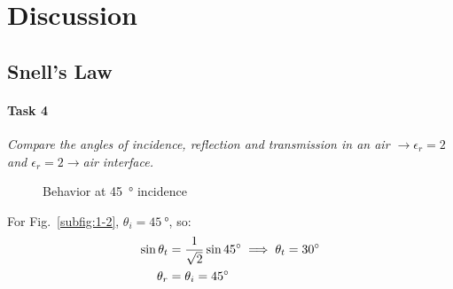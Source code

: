 \pagebreak
\section{Discussion}\label{sec:discussion}
\subsection{Snell's Law}
\paragraph{Task 4}\textit{Compare the angles of incidence, reflection and transmission in an air $\rightarrow \epsilon_r = 2$ and $\epsilon_r = 2 \rightarrow $air interface.}

\begin{figure}[htpb]
	\caption{Behavior at \SI{45}{\degree} incidence}
	\label{fig:snell}
\end{figure}
For Fig.~\ref{subfig:1-2}, $\theta_i = \SI{45}{\degree}$, so:
\begin{align*}
	\sin \theta_t &= {1 \over \sqrt{2}} \sin \SI{45}{\degree} \implies \theta_t = \SI{30}{\degree} \\
	\theta_r &= \theta_i = \SI{45}{\degree}
\end{align*}

